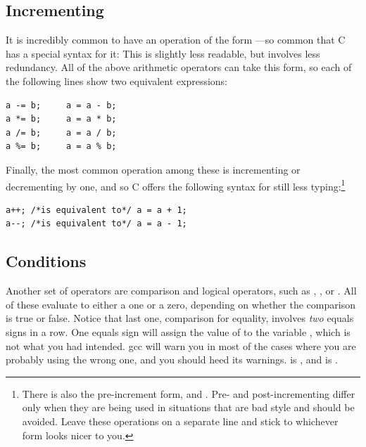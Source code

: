 \documentclass[12pt]{article}
\makeatletter
\def\ttindex#1{\index{#1@\cinline{#1}}}
\makeatother
\begin{document}
\subsection{Incrementing} It is incredibly common to have an operation of the form ---so
common that C has a special syntax for it:  This is slightly less readable, but involves less
redundancy. All of the above arithmetic operators can take this form, so each of the following lines show two
equivalent expressions: \\
\begin{lstlisting}
a -= b;     a = a - b;
a *= b;     a = a * b;
a /= b;     a = a / b;
a %= b;     a = a % b;
\end{lstlisting}

Finally, the most common operation among these is incrementing or decrementing by one, and so C offers the
following syntax for still less typing:\footnote{There is also the pre-increment form,  and
. Pre- and post-incrementing differ only when they are being used in situations that are bad style and should
be avoided. Leave these operations on a separate line and stick to whichever form looks nicer to you.} \\
\begin{lstlisting}
a++; /*is equivalent to*/ a = a + 1;
a--; /*is equivalent to*/ a = a - 1;
\end{lstlisting}



\subsection{Conditions} 	
\label{forloops}    
\ttindex{<} \ttindex{>} \ttindex{==}
Another set of operators are comparison and logical operators, such as ,
, or . All of these evaluate to either a one or a zero, depending on whether the
comparison is true or false. Notice that last one, comparison for equality, involves {\sl two} equals
signs in a row. One equals sign  will assign the value of  to the variable , which is not what
you had intended. gcc will warn you in most of the cases where you are
probably using the wrong one, and you should heed its warnings.  is , and  is .
\end{document}
